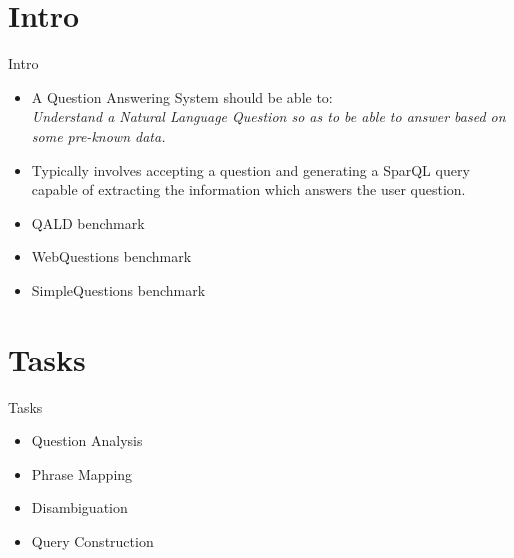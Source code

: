 \documentclass{beamer}
\begin{document}
\section{Intro}

\begin{frame}{Intro}
  \begin{cardTiny}
    \begin{itemize}
      \item A Question Answering System should be able to: \\
      \textit{Understand a Natural Language Question so as to be able to answer based on some pre-known data.}
    \end{itemize}
  \end{cardTiny}
  \begin{cardTiny}
    \begin{itemize}
      \item Typically involves accepting a question and generating a SparQL query capable of extracting the information which answers the user question.
    \end{itemize}
  \end{cardTiny}
  \begin{cardTiny}
    \begin{itemize}
      \item QALD benchmark
      \item WebQuestions benchmark
      \item SimpleQuestions benchmark
    \end{itemize}
  \end{cardTiny}
\end{frame}


\section{Tasks}

\begin{frame}{Tasks}
  \begin{card}
    \begin{itemize}
      \item Question Analysis
      \item Phrase Mapping
      \item Disambiguation
      \item Query Construction
    \end{itemize}
  \end{card}
\end{frame}
\end{document}
